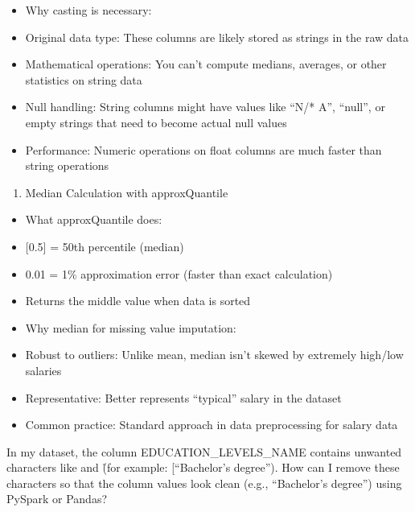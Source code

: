 \documentclass[
  letterpaper,
  DIV=11,
  numbers=noendperiod]{scrartcl}
\providecommand{\tightlist}{%
  \setlength{\itemsep}{0pt}\setlength{\parskip}{0pt}}\usepackage{longtable,booktabs,array}
\begin{document}
\begin{itemize}
\item
  Why casting is necessary:
\item
  Original data type: These columns are likely stored as strings in the
  raw data
\item
  Mathematical operations: You can't compute medians, averages, or other
  statistics on string data
\item
  Null handling: String columns might have values like ``N/* A'',
  ``null'', or empty strings that need to become actual null values
\item
  Performance: Numeric operations on float columns are much faster than
  string operations
\end{itemize}

\begin{enumerate}
\def\labelenumi{\arabic{enumi}.}
\setcounter{enumi}{1}
\tightlist
\item
  Median Calculation with approxQuantile
\end{enumerate}

\begin{itemize}
\item
  What approxQuantile does:
\item
  {[}0.5{]} = 50th percentile (median)
\item
  0.01 = 1\% approximation error (faster than exact calculation)
\item
  Returns the middle value when data is sorted
\item
  Why median for missing value imputation:
\item
  Robust to outliers: Unlike mean, median isn't skewed by extremely
  high/low salaries
\item
  Representative: Better represents ``typical'' salary in the dataset
\item
  Common practice: Standard approach in data preprocessing for salary
  data
\end{itemize}

\begin{tcolorbox}[enhanced jigsaw, colback=white, left=2mm, colframe=quarto-callout-color-frame, leftrule=.75mm, bottomrule=.15mm, arc=.35mm, breakable, rightrule=.15mm, toprule=.15mm, opacityback=0]

In my dataset, the column EDUCATION\_LEVELS\_NAME contains unwanted
characters like \n and \r (for example: {[}\n ``Bachelor's
degree''\n{]}). How can I remove these characters so that the column
values look clean (e.g., ``Bachelor's degree'') using PySpark or Pandas?

\end{tcolorbox}
\end{document}
